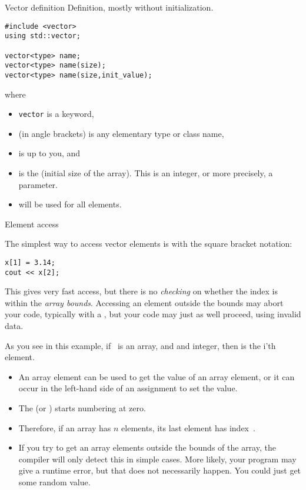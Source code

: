 \begin{block}{Vector definition}
  \label{sl:vector-def}
  Definition, mostly without initialization.
\begin{lstlisting}
#include <vector>
using std::vector;

vector<type> name;
vector<type> name(size);
vector<type> name(size,init_value);
\end{lstlisting}
where
\begin{itemize}
\item \lstinline{vector} is a keyword,
\item {} (in angle brackets) is any elementary type or class
  name,
\item {} is up to you, and
\item {} is the (initial size of the array). This is an integer,
  or more precisely, a  parameter.
\item {} will be used for all elements.
\end{itemize}
\end{block}

 {Element access}

The simplest way to access vector elements is with the square bracket notation:
\begin{lstlisting}
x[1] = 3.14;
cout << x[2];
\end{lstlisting}
This gives very fast access, but there is no \emph{checking} on whether the
index is within the \emph{array
  bounds}. Accessing an element outside
the bounds may abort your code, typically with a
, but your code may just as well
proceed, using invalid data.

As you see in this example, if ~is an array, and  and
integer, then  is the i'th element.
\begin{itemize}
\item An array element  can be used to get the value of an
  array element, or it can occur in the left-hand side of an
  assignment to set the value.
\item The  (or
  )  starts numbering at zero.
\item Therefore, if an array has $n$ elements, its last element has
  index~.
\item If you try to get an array elements outside the bounds of the
  array, the compiler will only detect this in simple cases. More
  likely, your program may give a runtime error, but that does not
  necessarily happen. You could just get some random value.
\end{itemize}

